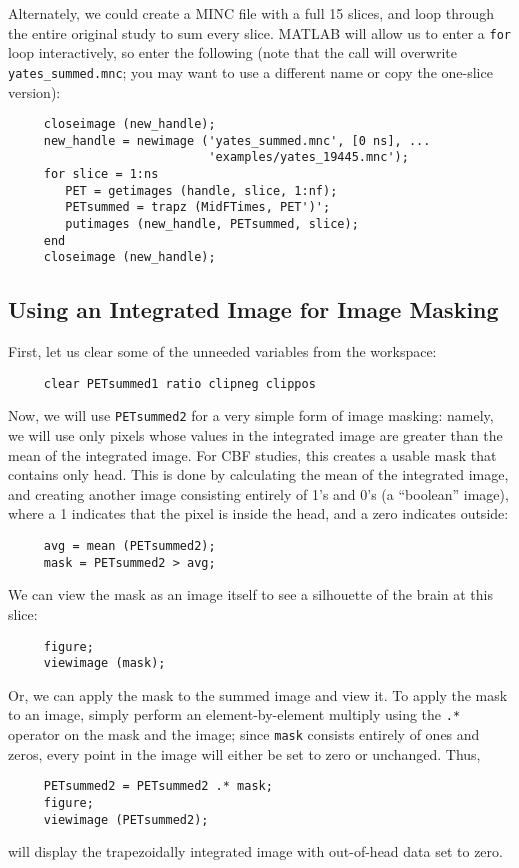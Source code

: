 Alternately, we could create a MINC file with a full 15 slices, and
loop through the entire original study to sum every slice.  MATLAB
will allow us to enter a \verb|for| loop interactively, so enter the
following (note that the  call will overwrite
\verb|yates_summed.mnc|; you may want to use a different name or copy
the one-slice version):
\begin{verbatim}
     closeimage (new_handle);
     new_handle = newimage ('yates_summed.mnc', [0 ns], ...
                            'examples/yates_19445.mnc');
     for slice = 1:ns
        PET = getimages (handle, slice, 1:nf);
        PETsummed = trapz (MidFTimes, PET')';
        putimages (new_handle, PETsummed, slice);
     end
     closeimage (new_handle);
\end{verbatim}

\subsection{Using an Integrated Image for Image Masking}

First, let us clear some of the unneeded variables from the workspace:
\begin{verbatim}
     clear PETsummed1 ratio clipneg clippos
\end{verbatim}

Now, we will use \verb|PETsummed2| for a very simple form of image
masking: namely, we will use only pixels whose values in the
integrated image are greater than the mean of the integrated image.
For CBF studies, this creates a usable mask that contains only head.
This is done by calculating the mean of the integrated image, and
creating another image consisting entirely of 1's and 0's (a
``boolean'' image), where a 1 indicates that the pixel is inside the
head, and a zero indicates outside:
\begin{verbatim}
     avg = mean (PETsummed2);
     mask = PETsummed2 > avg;
\end{verbatim}

We can view the mask as an image itself to see a silhouette of the
brain at this slice:
\begin{verbatim}
     figure;
     viewimage (mask);
\end{verbatim}
Or, we can apply the mask to the summed image and view it.  To apply
the mask to an image, simply perform an element-by-element multiply 
using the
\verb|.*| operator on the mask and the image; since \verb|mask|
consists entirely of ones and zeros, every point in the image will
either be set to zero or unchanged.  Thus,
\begin{verbatim}
     PETsummed2 = PETsummed2 .* mask;
     figure;
     viewimage (PETsummed2);
\end{verbatim}
will display the trapezoidally integrated image with out-of-head data
set to zero.

